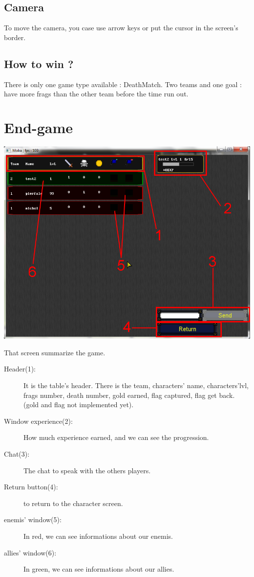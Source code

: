 \documentclass{scrreprt}
\begin{document}
		  \section{Camera}
		To move the camera, you case use arrow keys or put the cursor in the screen's border.
		  \section{How to win ?}
		There is only one game type available : DeathMatch. Two teams and one goal : have more frags than the other team before the time run out.
		  \chapter{End-game}
		  \begin{center}
		  \includegraphics[scale=0.4]{end_screen.png}
		  \end{center}
		  That screen summarize the game.
		  \begin{description}
		  \item[Header(1):]It is the table's header. There is the team,  characters' name, characters'lvl, frags number, death number, gold earned, flag captured, flag get back. (gold and flag not implemented yet).
		  \item[Window experience(2):]How much experience earned, and we can see the progression.
		  \item[Chat(3):] The chat to speak with the others players.
		  \item[Return button(4):] to return to the character screen.
		  \item[enemis' window(5):] In red, we can see informations about our enemis.
		  \item[allies' window(6):] In green, we can see informations about our allies.
		  \end{description}
\end{document}
